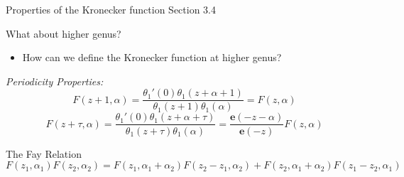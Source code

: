 \documentclass[11pt,aspectratio=169]{beamer}
\newcommand{\ee}[0]{\mathbf{e}}
\begin{document}
\begin{frame}{Properties of the Kronecker function}{\tiny \cite{BL13} Section 3.4}
    {
        \begin{block}{What about higher genus?}
            \begin{itemize}
                \item How can we define the Kronecker function at higher genus?
            \end{itemize}
        \end{block}
    }
    \emph{Periodicity Properties:}
    \[F(z+1,\alpha) = \frac{\theta_1'(0)\theta_1(z+\alpha+1)}{\theta_1(z+1)\theta_1(\alpha)} = F(z,\alpha)\]
    \[F(z+\tau,\alpha) = \frac{\theta_1'(0)\theta_1(z+\alpha+\tau)}{\theta_1(z+\tau)\theta_1(\alpha)} = \frac{\ee(-z-\alpha)}{\ee(-z)} F(z,\alpha)\]
    \begin{block}{The Fay Relation}
        \[F(z_1,\alpha_1)F(z_2,\alpha_2) = F(z_1,\alpha_1+\alpha_2)F(z_2-z_1,\alpha_2)+F(z_2,\alpha_1+\alpha_2)F(z_1-z_2,\alpha_1)\]
    \end{block}
\end{frame}
\end{document}
